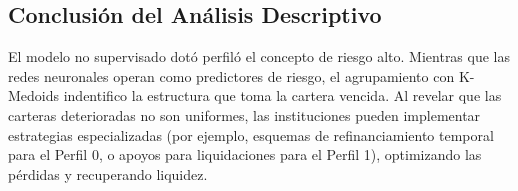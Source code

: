 \subsection{Conclusión del Análisis Descriptivo}
El modelo no supervisado dotó perfiló el concepto de riesgo alto. Mientras que las redes neuronales operan como predictores de riesgo, el agrupamiento con K-Medoids indentifico la estructura que toma la cartera vencida. Al revelar que las carteras deterioradas no son uniformes, las instituciones pueden implementar estrategias especializadas (por ejemplo, esquemas de refinanciamiento temporal para el Perfil 0, o apoyos para liquidaciones para el Perfil 1), optimizando las pérdidas y recuperando liquidez.
